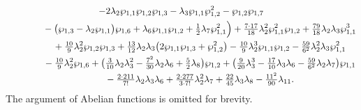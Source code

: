 \documentclass[pdftex]{sigma}
\numberwithin{equation}{section}
\begin{document}
\begin{gather*}
 - 2 \lambda_2 \wp_{1,1} \wp_{1,2} \wp_{1,3} - \lambda_3 \wp_{1,1} \wp_{1,2}^2 - \wp_{1,2} \wp_{1,7}\\
\hphantom{\mathcal{P}_{11}(u) =}{}
- \big(\wp_{1,3} - \lambda_2 \wp_{1,1} \big) \wp_{1,6} + \lambda_6 \wp_{1,1} \wp_{1,2}
 + \tfrac{1}{2} \lambda_7 \wp_{1,1}^2\Big) + \tfrac{7\cdot 17}{18} \lambda_2^2 \wp_{1,1}^2 \wp_{1,2}
 + \tfrac{79}{18} \lambda_2\lambda_3 \wp_{1,1}^3 \\
\hphantom{\mathcal{P}_{11}(u) =}{}
 + \tfrac{10}{9} \lambda_2^2 \wp_{1,2} \wp_{1,3}
 + \tfrac{13}{12} \lambda_2 \lambda_3 \big(2 \wp_{1,1} \wp_{1,3} + \wp_{1,2}^2\big)
 - \tfrac{10}{9} \lambda_2^3 \wp_{1,1} \wp_{1,2} - \tfrac{59}{6^2} \lambda_2^2 \lambda_3 \wp_{1,1}^2\\
\hphantom{\mathcal{P}_{11}(u) =}{}
 - \tfrac{10}{9} \lambda_2^2 \wp_{1,6} + \big(\tfrac{3}{10} \lambda_2\lambda_3^2 - \tfrac{7^2}{30} \lambda_2 \lambda_6 + \tfrac{5}{2} \lambda_8 \big) \wp_{1,2}
 + \big(\tfrac{9}{20} \lambda_3^3 - \tfrac{17}{10} \lambda_3 \lambda_6 - \tfrac{59}{6^2} \lambda_2 \lambda_7\big) \wp_{1,1} \\
\hphantom{\mathcal{P}_{11}(u) =}{}
 - \tfrac{2\cdot 211}{7!} \lambda_2 \lambda_3 \lambda_6 + \tfrac{2\cdot 277}{3\cdot 7!} \lambda_2^2 \lambda_7 + \tfrac{22}{45} \lambda_3 \lambda_8 - \tfrac{11^2}{90}\lambda_{11}.
\end{gather*}
The argument of Abelian functions is omitted for brevity.
\end{document}

